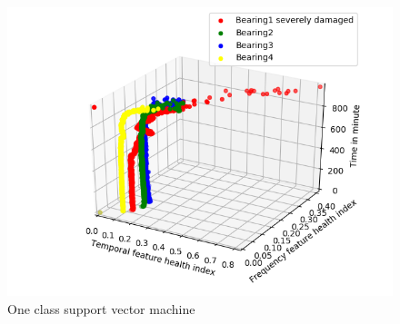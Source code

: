 \documentclass[../Main/thesis.tex]{subfiles}
\begin{document}
\begin{figure}[H] %
	\centering
	\includegraphics[width=5.3in]{../fig/3dplot1.png} 
	\caption{One class support vector machine }
	\label{fig:3dplot}
\end{figure}
\end{document}

